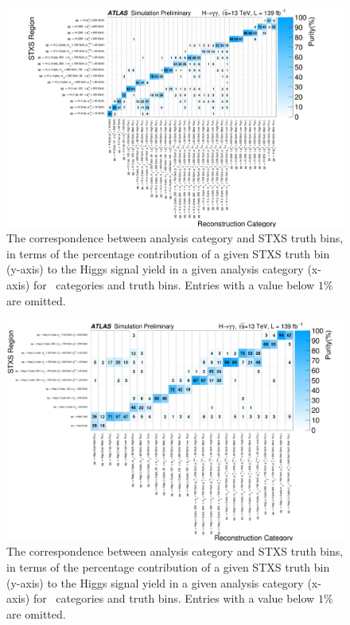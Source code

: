 \begin{figure}[h]
\centering
\includegraphics[width=1.09\textwidth]{figures/couplings_chapter/purity_2D_subplots_1}
\caption{The correspondence between analysis category and STXS truth bins, in terms of the percentage contribution of a given STXS truth bin (y-axis) to the Higgs signal yield in a given analysis category (x-axis) for \ggtoH\ categories and truth bins. Entries with a value below $1\%$ are omitted.}
\label{fig:yields_1}
\end{figure}


\begin{figure}[h]
\centering
\includegraphics[width=1.09\textwidth]{figures/couplings_chapter/purity_2D_subplots_2}
\caption{The correspondence between analysis category and STXS truth bins, in terms of the percentage contribution of a given STXS truth bin (y-axis) to the Higgs signal yield in a given analysis category (x-axis) for \qqtoHqq\ categories and truth bins. Entries with a value below $1\%$ are omitted.}
\label{fig:yields_2}
\end{figure}


